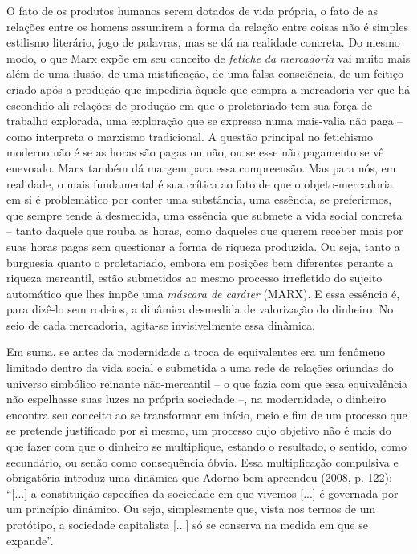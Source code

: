O fato de os produtos humanos serem dotados de vida própria, o fato de
as relações entre os homens assumirem a forma da relação entre coisas
não é simples estilismo literário, jogo de palavras, mas se dá na
realidade concreta. Do mesmo modo, o que Marx expõe em seu conceito de
\emph{fetiche} \emph{da} \emph{mercadoria} vai muito mais além de uma
ilusão, de uma mistificação, de uma falsa consciência, de um feitiço
criado após a produção que impediria àquele que compra a mercadoria ver
que há escondido ali relações de produção em que o proletariado tem sua
força de trabalho explorada, uma exploração que se expressa numa
mais-valia não paga -- como interpreta o marxismo tradicional. A questão
principal no fetichismo moderno não é se as horas são pagas ou não, ou
se esse não pagamento se vê enevoado. Marx também dá margem para essa
compreensão. Mas para nós, em realidade, o mais fundamental é sua
crítica ao fato de que o objeto-mercadoria em si é problemático por
conter uma substância, uma essência, se preferirmos, que sempre tende à
desmedida, uma essência que submete a vida social concreta -- tanto
daquele que rouba as horas, como daqueles que querem receber mais por
suas horas pagas sem questionar a forma de riqueza produzida. Ou seja,
tanto a burguesia quanto o proletariado, embora em posições bem
diferentes perante a riqueza mercantil, estão submetidos ao mesmo
processo irrefletido do sujeito automático que lhes impõe uma
\emph{máscara de caráter} (MARX). E essa essência é, para dizê-lo sem
rodeios, a dinâmica desmedida de valorização do dinheiro. No seio de
cada mercadoria, agita-se invisivelmente essa dinâmica.

Em suma, se antes da modernidade a troca de equivalentes era um fenômeno
limitado dentro da vida social e submetida a uma rede de relações
oriundas do universo simbólico reinante não-mercantil -- o que fazia com
que essa equivalência não espelhasse suas luzes na própria sociedade --,
na modernidade, o dinheiro encontra seu conceito ao se transformar em
início, meio e fim de um processo que se pretende justificado por si
mesmo, um processo cujo objetivo não é mais do que fazer com que o
dinheiro se multiplique, estando o resultado, o sentido, como
secundário, ou senão como consequência óbvia. Essa multiplicação
compulsiva e obrigatória introduz uma dinâmica que Adorno bem apreendeu
(2008, p. 122): ``{[}...{]} a constituição específica da sociedade em
que vivemos {[}...{]} é governada por um princípio dinâmico. Ou seja,
simplesmente que, vista nos termos de um protótipo, a sociedade
capitalista {[}...{]} só se conserva na medida em que se expande''.

